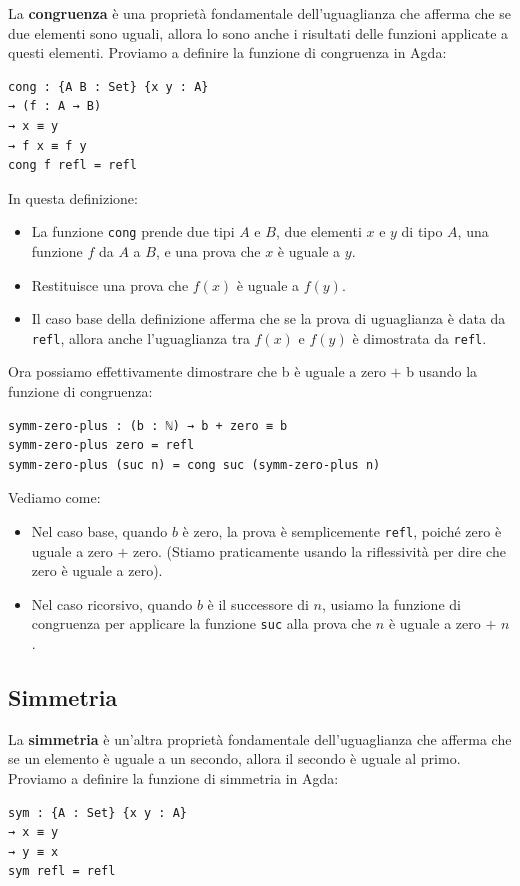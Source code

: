 \documentclass[a4paper]{article}
\theoremstyle{definition}
\theoremstyle{remark}
\begin{document}
La \textbf{congruenza} è una proprietà fondamentale dell'uguaglianza che afferma che se due elementi sono uguali, allora lo sono anche i risultati delle funzioni applicate a questi elementi.
Proviamo a definire la funzione di congruenza in Agda:
\begin{verbatim}
cong : {A B : Set} {x y : A} 
→ (f : A → B) 
→ x ≡ y 
→ f x ≡ f y
cong f refl = refl
\end{verbatim}
\noindent
In questa definizione:
\begin{itemize}
  \item La funzione \texttt{cong} prende due tipi \( A \) e \( B \), due elementi \( x \) e \( y \) di tipo \( A \), una funzione \( f \) da \( A \) a \( B \), e una prova che \( x \) è uguale a \( y \).
  \item Restituisce una prova che \( f(x) \) è uguale a \( f(y) \).
  \item Il caso base della definizione afferma che se la prova di uguaglianza è data da \texttt{refl}, allora anche l'uguaglianza tra \( f(x) \) e \( f(y) \) è dimostrata da \texttt{refl}.
\end{itemize}
Ora possiamo effettivamente dimostrare che b è uguale a zero $+$ b usando la funzione di congruenza:

\begin{verbatim}
symm-zero-plus : (b : ℕ) → b + zero ≡ b
symm-zero-plus zero = refl
symm-zero-plus (suc n) = cong suc (symm-zero-plus n)
\end{verbatim}
Vediamo come:
\begin{itemize}
  \item Nel caso base, quando \( b \) è zero, la prova è semplicemente \texttt{refl}, poiché zero è uguale a zero $+$ zero. (Stiamo praticamente usando la riflessività per dire che zero è uguale a zero).
  \item Nel caso ricorsivo, quando \( b \) è il successore di \( n \), usiamo la funzione di congruenza per applicare la funzione \texttt{suc} alla prova che \( n \) è uguale a zero $+$ \( n \).
\end{itemize}

\subsection{Simmetria}

La \textbf{simmetria} è un'altra proprietà fondamentale dell'uguaglianza che afferma che se un elemento è uguale a un secondo, allora il secondo è uguale al primo.
Proviamo a definire la funzione di simmetria in Agda:
\begin{verbatim}
sym : {A : Set} {x y : A}
→ x ≡ y
→ y ≡ x
sym refl = refl
\end{verbatim}
\end{document}
